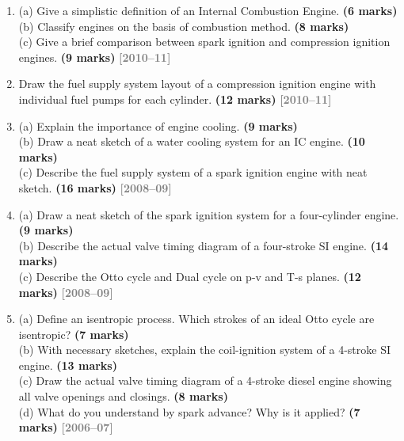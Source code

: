 \documentclass[12pt,a3paper]{article}
\newcommand{\yr}[1]{\hfill\textcolor{gray}{\small\textbf{[#1]}}}
\newcommand{\mk}[1]{\textcolor{orange!70!black}{\small\textbf{(#1 marks)}}}
\begin{document}
\begin{enumerate}
\item \label{qlabel:A2-Q15}
(a) Give a simplistic definition of an Internal Combustion Engine. \mk{6}\\
(b) Classify engines on the basis of combustion method. \mk{8}\\
(c) Give a brief comparison between spark ignition and compression ignition engines. \mk{9}
\yr{2010--11}




\item \label{qlabel:A2-Q16}
Draw the fuel supply system layout of a compression ignition engine with individual fuel pumps for each cylinder. \mk{12}
\yr{2010--11}




\item \label{qlabel:A2-Q23}
(a) Explain the importance of engine cooling. \mk{9}\\
(b) Draw a neat sketch of a water cooling system for an IC engine. \mk{10}\\
(c) Describe the fuel supply system of a spark ignition engine with neat sketch. \mk{16}
\yr{2008--09}




\item \label{qlabel:A2-Q24}
(a) Draw a neat sketch of the spark ignition system for a four-cylinder engine. \mk{9}\\
(b) Describe the actual valve timing diagram of a four-stroke SI engine. \mk{14}\\
(c) Describe the Otto cycle and Dual cycle on p-v and T-s planes. \mk{12}
\yr{2008--09}




\item \label{qlabel:A2-Q25}
(a) Define an isentropic process. Which strokes of an ideal Otto cycle are isentropic? \mk{7}\\
(b) With necessary sketches, explain the coil-ignition system of a 4-stroke SI engine. \mk{13}\\
(c) Draw the actual valve timing diagram of a 4-stroke diesel engine showing all valve openings and closings. \mk{8}\\
(d) What do you understand by spark advance? Why is it applied? \mk{7}
\yr{2006--07}





\end{enumerate}
\end{document}
